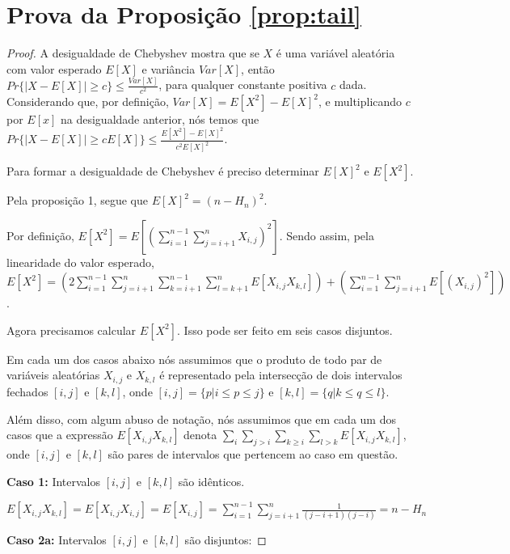 \documentclass[12pt]{article}
\begin{document}
\section{Prova da Proposição \ref{prop:tail}}
\begin{proof}

\noindent A desigualdade de Chebyshev mostra que se  $X$ é uma variável aleatória com valor esperado $E[X]$ e variância $Var[X]$,
então $Pr\{ |X - E[X]| \geq c \} \leq \frac{Var[X]}{c^2}$, para qualquer constante positiva $c$ dada.
Considerando que, por definição,  $Var[X] = E[X^2] - E[X]^2$, e multiplicando $c$ por $E[x]$ na desigualdade anterior, nós temos que 
$Pr\{ |X - E[X]| \geq c E[X] \} \leq \frac{E[X^2] - E[X]^2}{c^2 E[X]^2}$.

Para formar a desigualdade de Chebyshev é preciso determinar $E[X]^2$ e $E[X^2]$.

Pela proposição 1, segue que $E[X]^2 = (n - H_{n})^2$.

Por definição, $E[X^2] = E [( \sum\limits_{i=1}^{n-1} \sum\limits_{j=i+1}^{n} X_{i,j})^2]$.
Sendo assim, pela linearidade do valor esperado, $E[X^2] = ( 2 \sum\limits_{i=1}^{n-1} \sum\limits_{j=i+1}^{n}
\sum\limits_{k=i+1}^{n-1} \sum\limits_{l=k+1}^{n} E[X_{i,j} X_{k,l}] ) +
( \sum\limits_{i=1}^{n-1} \sum\limits_{j=i+1}^{n} E[(X_{i,j})^2] )$.

Agora precisamos calcular $E[X^2]$. Isso pode ser feito em seis casos disjuntos.

Em cada um dos casos abaixo nós assumimos que o produto de todo par de variáveis
aleatórias $X_{i, j}$ e $X_{k,l}$ é representado pela intersecção de dois
intervalos fechados $[i,j]$ e $[k,l]$, onde $[i,j] = \{p | i \leq p \leq j \}$
e $[k,l] = \{q | k \leq q \leq l \}$.

Além disso, com algum abuso de notação, nós assumimos que em cada um dos casos que a expressão
 $E[X_{i,j} X_{k,l}]$ denota $\sum\limits_{i}\sum\limits_{j >i}\sum\limits_{k \geq i}\sum\limits_{l > k} E[X_{i,j} X_{k,l}]$, 
 onde $[i,j]$ e $[k,l]$ são pares de intervalos que pertencem ao caso em questão.

{\bf Caso 1:} Intervalos $[i, j]$ e $[k, l]$ são idênticos.

$E[X_{i,j} X_{k,l}] = E[X_{i,j} X_{i,j}] = E[X_{i,j}] = \sum\limits_{i=1}^{n-1} \sum\limits_{j=i+1}^{n}
\frac{1}{(j-i+1)(j-i)} = n - H_n$

\vspace{0.5cm}


{\bf Caso 2a:} Intervalos $[i, j]$ e $[k, l]$ são disjuntos:


\end{proof}
\end{document}
